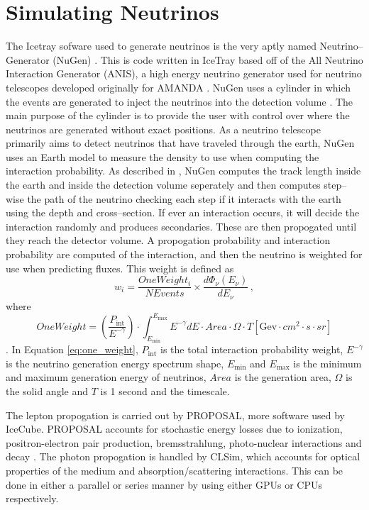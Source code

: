 \section{Simulating Neutrinos}

The Icetray sofware used to generate neutrinos is the very aptly named Neutrino--Generator (NuGen) \cite{icetray, icetray_art}. This is code written in IceTray based off of the All Neutrino Interaction Generator (ANIS), a high energy neutrino generator used for neutrino telescopes developed originally for AMANDA \cite{lepton_inj}. NuGen uses a cylinder in which the events are generated to inject the neutrinos into the detection volume \cite{sim_present}. The main purpose of the cylinder is to provide the user with control over where the neutrinos are generated without exact positions. As a neutrino telescope primarily aims to detect neutrinos that have traveled through the earth, NuGen uses an Earth model to measure the density to use when computing the interaction probability. As described in \cite{sim_present}, NuGen computes the track length inside the earth and inside the detection volume seperately and then computes step--wise the path of the neutrino checking each step if it interacts with the earth using the depth and cross--section. If ever an interaction occurs, it will decide the interaction randomly and produces secondaries. These are then propogated until they reach the detector volume. A propogation probability and interaction probability are computed of the interaction, and then the neutrino is weighted for use when predicting fluxes. This weight is defined as
\begin{equation}
  w_{i} = \frac{OneWeight_{i}}{NEvents}\times \frac{d\Phi_{\nu}(E_{\nu})}{dE_{\nu}} \, ,
\end{equation}
where
\begin{equation}\label{eq:one_weight}
  OneWeight = \left(\frac{P_{\text{int}}}{E^{-\gamma}}\right)\cdot \int_{E_{\text{min}}}^{E_{\text{max}}}E^{-\gamma}dE\cdot Area\cdot \Omega \cdot T[\text{Gev}\cdot cm^{2}\cdot s\cdot sr]
\end{equation}.
In Equation \ref{eq:one_weight}, $P_{\text{int}}$ is the total interaction probability weight, $E^{-\gamma}$ is the neutrino generation energy spectrum shape, $E_{\text{min}}$ and $E_{\text{max}}$ is the minimum and maximum generation energy of neutrinos, $Area$ is the generation area, $\Omega$ is the solid angle and $T$ is 1 second and the timescale.

The lepton propogation is carried out by PROPOSAL, more software used by IceCube. PROPOSAL accounts for stochastic energy losses due to ionization, positron-electron pair production, bremsstrahlung, photo-nuclear interactions and decay \cite{sim_present}. The photon propogation is handled by CLSim, which accounts for optical properties of the medium and absorption/scattering interactions. This can be done in either a parallel or series manner by using either GPUs or CPUs respectively. 

